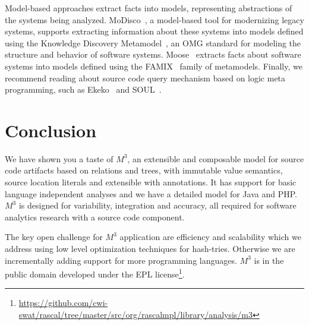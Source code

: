 \documentclass[conference]{IEEEtran}
\newcommand{\mthree}{\ensuremath{M^3}\xspace}
\begin{document}
Model-based approaches extract facts into models, representing abstractions of
the systems being analyzed. MoDisco~\cite{DBLP:journals/infsof/BruneliereCDM14,DBLP:conf/kbse/BruneliereCJM10},
a model-based tool for modernizing legacy
systems, supports extracting information about these systems into models
defined using the Knowledge Discovery Metamodel~\cite{omg-kdm}, an OMG
standard for modeling the structure and behavior of software systems. 
Moose~\cite{DBLP:conf/sigsoft/NierstraszDG05,DBLP:journals/sigsoft/Nierstrasz12}
extracts facts about software systems into models defined using the FAMIX~\cite{famix}
family of metamodels. Finally, we recommend reading about source code query mechanism based on logic meta programming, such as Ekeko~\cite{ekeko} and SOUL~\cite{soul}.

\section{Conclusion}

We have shown you a taste of \mthree, an extensible and composable model for
source code artifacts based on relations and trees, with immutable value
semantics, source location literals and extensible with annotations. It has
support for basic language independent analyses and we have a detailed model
for Java and PHP. \mthree is designed for variability, integration and accuracy, all required for software analytics research with a source code component.


The key open challenge for \mthree application are efficiency and scalability which we address using low level optimization techniques for hash-tries. Otherwise we are incrementally adding support for more programming languages. \mthree is in the public domain developed under the EPL license\footnote{\url{https://github.com/cwi-swat/rascal/tree/master/src/org/rascalmpl/library/analysis/m3}}.



\end{document}
